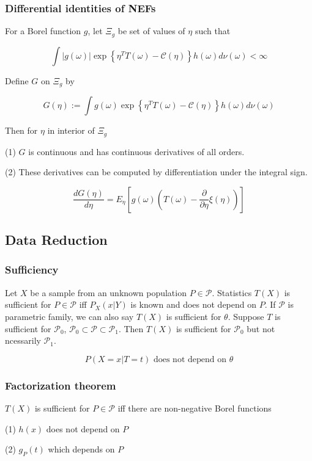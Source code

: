 \subsubsection{Differential identities of NEFs}
For a Borel function $g$, let $\Xi_g$ be set of values of $\eta$ such that

$$
\int |g(\omega)|\exp\left\{\eta^T T(\omega)-\mathcal{C}(\eta)\right\}h(\omega) d\nu(\omega) < \infty
$$

Define $G$ on $\Xi_g$ by

$$
G(\eta) := \int g(\omega) \exp\left\{\eta^T T(\omega)-\mathcal{C}(\eta)\right\}h(\omega) d\nu(\omega)
$$

Then for $\eta$ in interior of $\Xi_g$

(1) $G$ is continuous and has continuous derivatives of all orders.

(2) These derivatives can be computed by differentiation under the integral sign.

$$
\frac{dG(\eta)}{d\eta} = E_\eta \left[g(\omega) \left(T(\omega) - \frac{\partial}{\partial\eta}\xi(\eta)\right)\right]
$$

\subsection{Data Reduction}

\subsubsection{Sufficiency}
Let $X$ be a sample from an unknown population $P\in\mathcal{P}$. Statistics $T(X)$ is sufficient for $P\in\mathcal{P}$ iff $P_X(x|Y)$ is known and does not depend on $P$.
If $\mathcal{P}$ is parametric family, we can also say $T(X)$ is sufficient for $\theta$. Suppose $T$ is sufficient for $\mathcal{P}_0$, $\mathcal{P}_0\subset \mathcal{P}\subset \mathcal{P}_1$. Then $T(X)$ is sufficient for $\mathcal{P}_0$ but not ncessarily $\mathcal{P}_1$.

$$
P(X=x|T=t) \text{ does not depend on } \theta
$$

\subsubsection{Factorization theorem}
$T(X)$ is sufficient for $P\in\mathcal{P}$ iff there are non-negative Borel functions

(1) $h(x)$ does not depend on $P$

(2) $g_P(t)$ which depends on $P$

